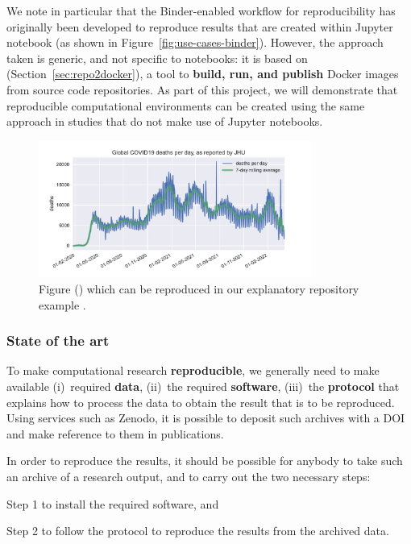 We note in particular that the Binder-enabled workflow for reproducibility has
originally been developed to reproduce results that are created within Jupyter
notebook (as shown in Figure~\ref{fig:use-cases-binder}).
However, the approach taken is generic, and not specific to notebooks: it is
based on \repotodocker{} (Section~\ref{sec:repo2docker}), a tool to \textbf{build, run, and
publish} Docker images from source code repositories.
As part of this project, we will demonstrate that reproducible
computational environments can be created using the same approach
in studies that do not make use of Jupyter notebooks.

\begin{figure}
  \centering
  \includegraphics[width=0.8\textwidth]{images/figure1.pdf}
  \caption{Figure () which can be reproduced in our explanatory repository example
    \cite{ReproducibilityRepositoryExample2022}. \label{fig:reproducibility-example-covid}}
\end{figure}


\subsubsection{State of the art}

To make computational research \textbf{reproducible}, we generally need to make available
(i)~required \textbf{data}, (ii)~the required \textbf{software}, (iii)~the \textbf{protocol} that explains
how to process the data to obtain the result that is to be reproduced. Using
services such as Zenodo, it is possible to deposit such archives with a DOI and
make reference to them in publications.

In order to reproduce the results, it should be possible for anybody to take such an archive of a research
output, and to carry out the two necessary steps:
\begin{compactitem}
\item Step 1 to install the required software, and
\item Step 2 to follow the protocol to reproduce the results from the archived data.
\end{compactitem}

